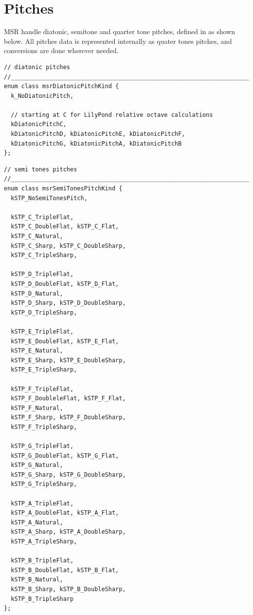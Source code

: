 \section{Pitches}\label{Pitches}

MSR handle diatonic, semitone and quarter tone pitches, defined in  as shown below.
All pitches data is represented internally as quater tones pitches, and conversions are done wherever needed.

\begin{lstlisting}[language=CPlusPlus]
// diatonic pitches
//______________________________________________________________________________
enum class msrDiatonicPitchKind {
  k_NoDiatonicPitch,

  // starting at C for LilyPond relative octave calculations
  kDiatonicPitchC,
  kDiatonicPitchD, kDiatonicPitchE, kDiatonicPitchF,
  kDiatonicPitchG, kDiatonicPitchA, kDiatonicPitchB
};
\end{lstlisting}

\begin{lstlisting}[language=CPlusPlus]
// semi tones pitches
//______________________________________________________________________________
enum class msrSemiTonesPitchKind {
  kSTP_NoSemiTonesPitch,

  kSTP_C_TripleFlat,
  kSTP_C_DoubleFlat, kSTP_C_Flat,
  kSTP_C_Natural,
  kSTP_C_Sharp, kSTP_C_DoubleSharp,
  kSTP_C_TripleSharp,

  kSTP_D_TripleFlat,
  kSTP_D_DoubleFlat, kSTP_D_Flat,
  kSTP_D_Natural,
  kSTP_D_Sharp, kSTP_D_DoubleSharp,
  kSTP_D_TripleSharp,

  kSTP_E_TripleFlat,
  kSTP_E_DoubleFlat, kSTP_E_Flat,
  kSTP_E_Natural,
  kSTP_E_Sharp, kSTP_E_DoubleSharp,
  kSTP_E_TripleSharp,

  kSTP_F_TripleFlat,
  kSTP_F_DoubleleFlat, kSTP_F_Flat,
  kSTP_F_Natural,
  kSTP_F_Sharp, kSTP_F_DoubleSharp,
  kSTP_F_TripleSharp,

  kSTP_G_TripleFlat,
  kSTP_G_DoubleFlat, kSTP_G_Flat,
  kSTP_G_Natural,
  kSTP_G_Sharp, kSTP_G_DoubleSharp,
  kSTP_G_TripleSharp,

  kSTP_A_TripleFlat,
  kSTP_A_DoubleFlat, kSTP_A_Flat,
  kSTP_A_Natural,
  kSTP_A_Sharp, kSTP_A_DoubleSharp,
  kSTP_A_TripleSharp,

  kSTP_B_TripleFlat,
  kSTP_B_DoubleFlat, kSTP_B_Flat,
  kSTP_B_Natural,
  kSTP_B_Sharp, kSTP_B_DoubleSharp,
  kSTP_B_TripleSharp
};
\end{lstlisting}

